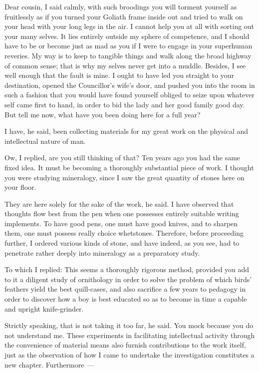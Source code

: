 \documentclass[12pt]{article}
\begin{document}
Dear cousin, I said calmly, with such broodings you will torment
yourself as fruitlessly as if you turned your Goliath frame inside
out and tried to walk on your head with your long legs in the air. I
cannot help you at all with sorting out your many selves. It lies
entirely outside my sphere of competence, and I should have to be or
become just as mad as you if I were to engage in your superhuman
reveries. My way is to keep to tangible things and walk along the
broad highway of common sense; that is why my selves never get into a
muddle. Besides, I see well enough that the fault is mine. I ought
to have led you straight to your destination, opened the Councillor's
wife's door, and pushed you into the room in such a fashion that you
would have found yourself obliged to seize upon whatever self came
first to hand, in order to bid the lady and her good family good day.
But tell me now, what have you been doing here for a full year?

I have, he said, been collecting materials for my great work on
the physical and intellectual nature of man.

Ow, I replied, are you still thinking of that? Ten years ago you
had the same fixed idea. It must be becoming a thoroughly substantial
piece of work. I thought you were studying mineralogy, since I saw
the great quantity of stones here on your floor.

They are here solely for the sake of the work, he said. I have
observed that thoughts flow best from the pen when one possesses
entirely suitable writing implements. To have good pens, one must
have good knives, and to sharpen them, one must possess really choice
whetstones. Therefore, before proceeding further, I ordered various
kinds of stone, and have indeed, as you see, had to penetrate rather
deeply into mineralogy as a preparatory study.

To which I replied: This seems a thoroughly rigorous method,
provided you add to it a diligent study of ornithology in order to
solve the problem of which birds' feathers yield the best quill-cases,
and also sacrifice a few years to pedagogy in order to discover how
a boy is best educated so as to become in time a capable and upright
knife-grinder.

Strictly speaking, that is not taking it too far, he said. You
mock because you do not understand me. These experiments in
facilitating intellectual activity through the convenience of material
means also furnish contributions to the work itself, just as the
observation of how I came to undertake the investigation constitutes
a new chapter. Furthermore~---
\end{document}
